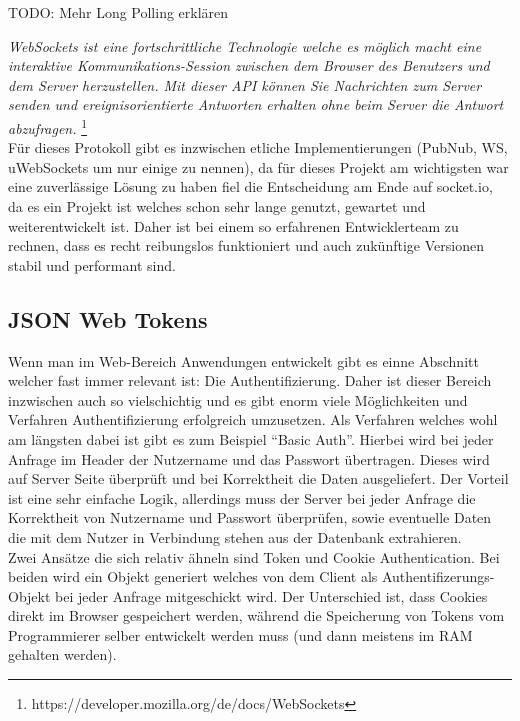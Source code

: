 TODO: Mehr Long Polling erklären

\emph{\glqq   
WebSockets ist eine fortschrittliche Technologie welche es möglich macht eine interaktive Kommunikations-Session zwischen dem Browser des Benutzers und dem Server herzustellen. Mit dieser API können Sie Nachrichten zum Server senden und ereignisorientierte Antworten erhalten ohne beim Server die Antwort abzufragen.
\grqq} \footnote{https://developer.mozilla.org/de/docs/WebSockets} \\


Für dieses Protokoll gibt es inzwischen etliche Implementierungen (PubNub, WS, uWebSockets um nur einige zu nennen), da für dieses Projekt am wichtigsten war eine zuverlässige Lösung zu haben fiel die Entscheidung am Ende auf socket.io, da es ein Projekt ist welches schon sehr lange genutzt, gewartet und weiterentwickelt ist. Daher ist bei einem so erfahrenen Entwicklerteam zu rechnen, dass es recht reibungslos funktioniert und auch zukünftige Versionen stabil und performant sind.

\subsection{JSON Web Tokens} \label{JWT}

Wenn man im Web-Bereich Anwendungen entwickelt gibt es einne Abschnitt welcher fast immer relevant ist: Die Authentifizierung. Daher ist dieser Bereich inzwischen auch so vielschichtig und es gibt enorm viele Möglichkeiten und Verfahren Authentifizierung erfolgreich umzusetzen. Als Verfahren welches wohl am längsten dabei ist gibt es zum Beispiel ``Basic Auth''. Hierbei wird bei jeder Anfrage im Header der Nutzername und das Passwort übertragen. Dieses wird auf Server Seite überprüft und bei Korrektheit die Daten ausgeliefert. Der Vorteil ist eine sehr einfache Logik, allerdings muss der Server bei jeder Anfrage die Korrektheit von Nutzername und Passwort überprüfen, sowie eventuelle Daten die mit dem Nutzer in Verbindung stehen aus der Datenbank extrahieren. \\

Zwei Ansätze die sich relativ ähneln sind Token und Cookie Authentication. Bei beiden wird ein Objekt generiert welches von dem Client als Authentifizerungs-Objekt bei jeder Anfrage mitgeschickt wird. Der Unterschied ist, dass Cookies direkt im Browser gespeichert werden, während die Speicherung von Tokens vom Programmierer selber entwickelt werden muss (und dann meistens im RAM gehalten werden). \\

